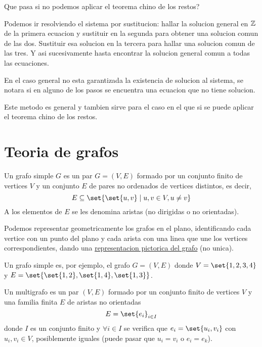 \begin{remark}
	Que pasa si no podemos aplicar el teorema chino de los restos?
	
	Podemos ir resolviendo el sistema por sustitucion: hallar la solucion general en \(\mathbb{Z} \) de la primera ecuacion y sustituir en la segunda para obtener una solucion comun de las dos. Sustituir esa solucion en la tercera para hallar una solucion comun de las tres. Y asi sucesivamente hasta encontrar la solucion general comun a todas las ecuaciones.
	
	En el caso general no esta garantizada la existencia de solucion al sistema, se notara si en alguno de los pasos se encuentra una ecuacion que no tiene solucion.
	
	Este metodo es general y tambien sirve para el caso en el que si se puede aplicar el teorema chino de los restos.
\end{remark}

\part{Teoria de grafos}
\begin{definition}
	Un grafo simple \(G \) es un par \(G = (V,E )\) formado por un conjunto finito de vertices \(V \) y un conjunto \(E \) de pares no ordenados de vertices distintos, es decir,
	\[
		E \subseteq \set{\set{u,v} \mid u,v \in V, u \neq v }
	\]
	A los elementos de \(E \) se les denomina aristas (no dirigidas o no orientadas).
\end{definition}

Podemos representar geometricamente los grafos en el plano, identificando cada vertice con un punto del plano y cada arista con una linea que une los vertices correspondientes, dando una \underline{representacion pictorica del grafo} (no unica).

\begin{example}
	Un grafo simple es, por ejemplo, el grafo \(G=(V,E )\) donde \(V = \set{1,2,3,4}\) y \(E = \set{\set{1,2}, \set{1,4}, \set{1,3}}\).
\end{example}

\begin{definition}[Multigrafo]
	Un multigrafo es un par \((V,E )\) formado por un conjunto finito de vertices \(V \) y una familia finita \(E \) de aristas no orientadas
	\[
		E = \set{e_i}_{i \in I}
	\]
	donde \(I \) es un conjunto finito y \(\forall i \in I \) se verifica que \(e_i = \set{u_i,v_i }\) con \(u_i,v_i \in V\), posiblemente iguales (puede pasar que \(u_i = v_i \) o \(e_i = e_k \)).
\end{definition}

